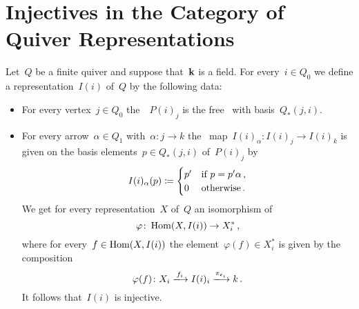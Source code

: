 \section{Injectives in the Category of Quiver Representations}


\begin{remark}
  Let~$Q$ be a finite quiver and suppose that~$\mathbf{k}$ is a field.
  For every~$i \in Q_0$ we define a representation~$I(i)$ of~$Q$ by the following data:
  \begin{itemize}
    \item
      For every vertex~$j \in Q_0$ the~{\kvs}~$P(i)_j$ is the free~{\kvs} with basis~$Q_*(j,i)$.
    \item
      For every arrow~$\alpha \in Q_1$ with~$\alpha \colon j \to k$ the~{\klin} map~$I(i)_\alpha \colon I(i)_j \to I(i)_k$ is given on the basis elements~$p \in Q_*(j,i)$ of~$P(i)_j$ by
      \[
        I(i)_\alpha(p)
        \coloneqq
        \begin{cases}
          p'  & \text{if~$p = p' \alpha$} \,, \\
          0   & \text{otherwise}  \,.
        \end{cases}
      \]
      We get for every representation~$X$ of~$Q$ an isomorphism of~{\kvs}
      \[
        \varphi
        \colon
        \operatorname{Hom}(X, I(i))
        \to
        X_i^* \,,
      \]
      where for every~$f \in \operatorname{Hom}(X,I(i))$ the element~$\varphi(f) \in X_i^*$ is given by the composition
      \[
        \varphi(f)
        \colon
        X_i
        \xlongto{f_i}
        I(i)_i
        \xlongto{\pi_{\varepsilon_i}}
        k \,.
      \]
      It follows that~$I(i)$ is injective.
  \end{itemize}
\end{remark}


